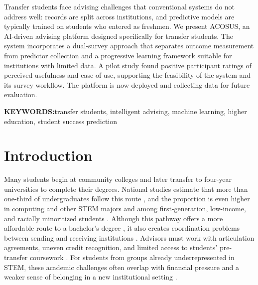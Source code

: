 \documentclass[letterpaper,11pt]{article}
\begin{document}
Transfer students face advising challenges that conventional systems do not address well: records are split across institutions, and predictive models are typically trained on students who entered as freshmen. We present ACOSUS, an AI-driven advising platform designed specifically for transfer students. The system incorporates a dual-survey approach that separates outcome measurement from predictor collection and a progressive learning framework suitable for institutions with limited data. A pilot study found positive participant ratings of perceived usefulness and ease of use, supporting the feasibility of the system and its survey workflow. The platform is now deployed and collecting data for future evaluation.

\bigskip

\noindent\textbf{KEYWORDS:}\quad transfer students, intelligent advising, machine learning, higher education, student success prediction

\section{Introduction}\label{sec:introduction}

Many students begin at community colleges and later transfer to four-year universities to complete their degrees. National studies estimate that more than one-third of undergraduates follow this route \parencite{monaghan2015}, and the proportion is even higher in computing and other STEM majors and among first-generation, low-income, and racially minoritized students \parencite{computingtransfer2024,wali2025transfer}. Although this pathway offers a more affordable route to a bachelor's degree \parencite{factoranalysis2023}, it also creates coordination problems between sending and receiving institutions \parencite{nguyen2025school}. Advisors must work with articulation agreements, uneven credit recognition, and limited access to students' pre-transfer coursework \parencite{nguyen2024community,roksa2008credits}. For students from groups already underrepresented in STEM, these academic challenges often overlap with financial pressure and a weaker sense of belonging in a new institutional setting \parencite{computingtransfer2024,nguyen2025school}.
\end{document}
